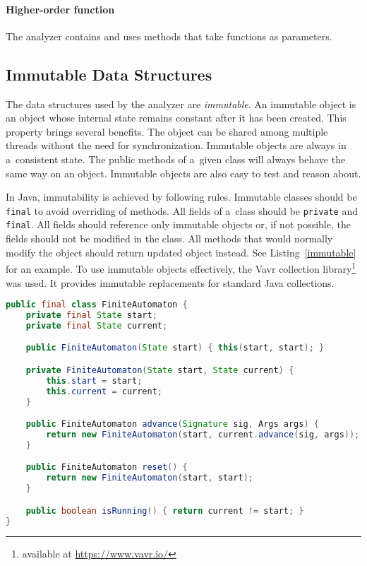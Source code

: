 \paragraph{Higher-order function}
The analyzer contains and uses methods that take functions as parameters.

\subsection{Immutable Data Structures}

The data structures used by the analyzer are \emph{immutable}. An immutable
object is an object whose internal state remains constant after it has been
created.  This property brings several benefits. The object can be shared among
multiple threads without the need for synchronization. Immutable objects are
always in a~consistent state. The public methods of a~given class will always
behave the same way on an object. Immutable objects are also easy to test and
reason about.

In Java, immutability is achieved by following rules. Immutable classes should
be \texttt{final} to avoid overriding of methods. All fields of a~class
should be \texttt{private} and \texttt{final}. All fields should reference only
immutable objects or, if not possible, the fields should not be modified in the
class. All methods that would normally modify the object should return updated
object instead. See Listing~\ref{immutable} for an example. To use immutable
objects effectively, the Vavr collection library\footnote{available at
\url{https://www.vavr.io/}} was used. It provides immutable replacements for
standard Java collections.

\begin{lstlisting}[language=java, label=immutable, float=hbt,
caption={Simplified implementation of an immutable finite automaton. The
automaton consists of references to the starting state and the current state.
The public constructor allows creating automatons that are in their starting
states, ensuring consistency. The advance method does not update the current
state but creates a~new finite automaton with an updated current state.}]
public final class FiniteAutomaton {
    private final State start;
    private final State current;

    public FiniteAutomaton(State start) { this(start, start); }

    private FiniteAutomaton(State start, State current) {
        this.start = start;
        this.current = current;
    }

    public FiniteAutomaton advance(Signature sig, Args args) {
        return new FiniteAutomaton(start, current.advance(sig, args));
    }

    public FiniteAutomaton reset() {
        return new FiniteAutomaton(start, start);
    }

    public boolean isRunning() { return current != start; }
}
\end{lstlisting}

